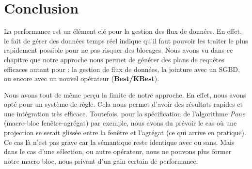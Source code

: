 \section{Conclusion}\label{sec:valid:perfs:conclusion}
La performance est un élément clé pour la gestion des flux de données. En effet, le fait de gérer des données temps réel indique qu'il faut pouvoir les traiter le plus rapidement possible pour ne pas risquer des blocages. Nous avons vu dans ce chapitre que notre approche nous permet de générer des plans de requêtes efficaces autant pour : la gestion de flux de données, la jointure avec un SGBD, ou encore avec un nouvel opérateur (\textbf{Best/KBest}).

Nous avons tout de même perçu la limite de notre approche. En effet, nous avons opté pour un système de règle. Cela nous permet d'avoir des résultats rapides et une intégration très efficace. Toutefois, pour la spécification de l'algorithme \textit{Pane} (macro-bloc fenêtre-agrégat) par exemple, nous avons du prévoir le cas où une projection se serait glissée entre la fenêtre et l'agrégat (ce qui arrive en pratique). Ce cas là n'est pas grave car la sémantique reste identique avec ou sans. Mais dans le cas d'une sélection, ou autre opérateur, nous ne pouvons plus former notre macro-bloc, nous privant d'un gain certain de performance.